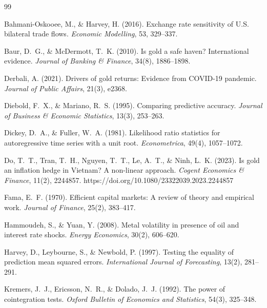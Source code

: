 \documentclass[12pt,a4paper]{article}
\begin{document}
\newpage

\begin{thebibliography}{99}

Bahmani-Oskooee, M., \& Harvey, H. (2016).
Exchange rate sensitivity of U.S. bilateral trade flows.
\textit{Economic Modelling}, 53, 329--337.

Baur, D.~G., \& McDermott, T.~K. (2010).
Is gold a safe haven? International evidence.
\textit{Journal of Banking \& Finance}, 34(8), 1886--1898.

Derbali, A. (2021).
Drivers of gold returns: Evidence from COVID-19 pandemic.
\textit{Journal of Public Affairs}, 21(3), e2368.

Diebold, F.~X., \& Mariano, R.~S. (1995).
Comparing predictive accuracy.
\textit{Journal of Business \& Economic Statistics}, 13(3), 253--263.

Dickey, D.~A., \& Fuller, W.~A. (1981).
Likelihood ratio statistics for autoregressive time series with a unit root.
\textit{Econometrica}, 49(4), 1057--1072.

Do, T.~T., Tran, T.~H., Nguyen, T.~T., Le, A.~T., \& Ninh, L.~K. (2023).
Is gold an inflation hedge in Vietnam? A non-linear approach.
\textit{Cogent Economics \& Finance}, 11(2), 2244857.
https://doi.org/10.1080/23322039.2023.2244857

Fama, E.~F. (1970).
Efficient capital markets: A review of theory and empirical work.
\textit{Journal of Finance}, 25(2), 383--417.

Hammoudeh, S., \& Yuan, Y. (2008).
Metal volatility in presence of oil and interest rate shocks.
\textit{Energy Economics}, 30(2), 606--620.

Harvey, D., Leybourne, S., \& Newbold, P. (1997).
Testing the equality of prediction mean squared errors.
\textit{International Journal of Forecasting}, 13(2), 281--291.

Kremers, J.~J., Ericsson, N.~R., \& Dolado, J.~J. (1992).
The power of cointegration tests.
\textit{Oxford Bulletin of Economics and Statistics}, 54(3), 325--348.


\end{thebibliography}
\end{document}
